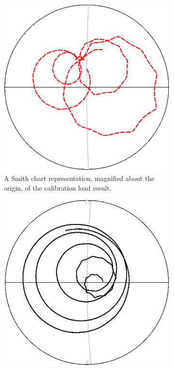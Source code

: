 \documentclass[../thesis/thesis.tex]{subfiles}
\begin{document}
\begin{refsection}
\begin{figure}
	\centering
	\begin{subfigure}{0.45\textwidth}
		\centering
	    \includegraphics[width=0.9\linewidth]{dir-a.png}
	    \caption{A Smith chart representation, magnified about the origin, of the calibration load result.}
    \end{subfigure}\hfill%
	\begin{subfigure}{0.45\textwidth}
	    \centering
	    \includegraphics[width=0.9\linewidth]{dir-b.png}

\end{subfigure}
\end{figure}
\end{refsection}
\end{document}
